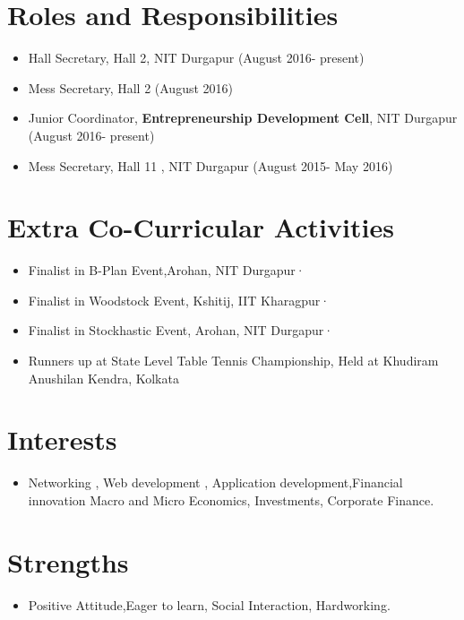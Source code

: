 \documentclass[11pt,a4paper,sans]{moderncv}        %
\begin{document}
\section{Roles and Responsibilities}
\begin{itemize}
\item Hall Secretary, Hall 2, NIT Durgapur (August 2016- present)
\item Mess Secretary, Hall 2 (August 2016)
\item Junior Coordinator,\textbf{ Entrepreneurship Development Cell}, NIT Durgapur (August 2016- present)

\item Mess Secretary, Hall 11 , NIT Durgapur  (August 2015- May 2016)
\end{itemize}

\section{Extra Co-Curricular Activities}
\begin{itemize}
\item \noindent Finalist in B-Plan Event,Arohan, NIT Durgapur·\item \noindent Finalist in Woodstock Event, Kshitij, IIT Kharagpur·\item \noindent Finalist in Stockhastic Event,  Arohan, NIT Durgapur·\item \noindent Runners up at State Level Table Tennis Championship, Held at Khudiram Anushilan Kendra, Kolkata
\end{itemize}

\section{Interests}
\begin{itemize}
\item \noindent Networking , Web development , Application development,Financial innovation Macro and Micro Economics, Investments, Corporate Finance.
\end{itemize}

\section{Strengths}
\begin{itemize}
\item \noindent Positive Attitude,Eager to learn, Social Interaction, Hardworking.
\end{itemize}
\end{document}
